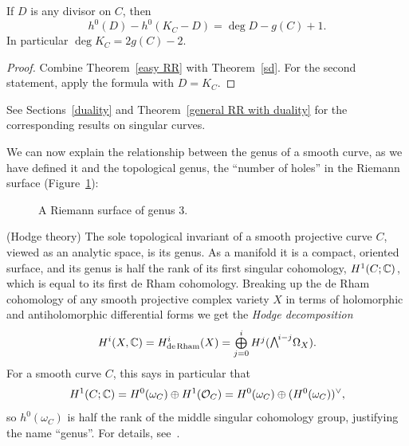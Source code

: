 \begin{theorem}\label{RR theorem}
If $D$ is any divisor on $C$, then 
$$
h^0(D) - h^0(K_C -D) = \deg D - g(C) +1.
$$
In particular $\deg K_C = 2g(C) -2$.
\end{theorem}

\begin{proof}
Combine Theorem~\ref{easy RR} with Theorem~\ref{sd}. For the second statement,
apply the formula with $D = K_C$.
\end{proof}

See Sections~\ref{duality} and Theorem~\ref{general RR with duality} for the corresponding results on singular curves.

We can now explain the relationship between the genus of a smooth curve, as we have defined it and the 
topological genus, the ``number of holes'' in the Riemann surface (Figure~\ref{RiemannSurface}):


\begin{figure}   %
\vskip-20pt
\vskip-15pt
\caption{A Riemann surface of genus 3.
}
\label{RiemannSurface}
\end{figure}


\begin{fact} (Hodge theory)
The sole topological invariant of a smooth projective curve $C$,
viewed as an analytic space, is its genus. As a manifold it is a
compact, oriented surface, and its genus is half the rank of its first
singular cohomology, $H^{1}(C; {\mathbb C})$, which is equal to its first 
de Rham 
cohomology.
Breaking up the de Rham cohomology of any smooth projective complex variety $X$ in terms of holomorphic and antiholomorphic differential
forms we get the \emph{Hodge decomposition}
$$
H^i(X,\CC) = H^i_{\mathrm{de\,Rham}}(X) = 
\tsty\bigoplus\limits_{j=0}^i H^j(\mwedge^{i-j} \Omega_X).
$$
For a smooth curve $C$, this says in  particular that
$$
H^1(C; {\mathbb C}) = H^0(\omega_C)\oplus H^1({\mathcal O}_C) = H^0(\omega_C)\oplus (H^0(\omega_C))^\vee, 
$$
so $ h^0(\omega_C)$ is half the rank of the middle singular cohomology
group, justifying the name ``genus''. For details, 
see~\cite[p.\,116]{Griffiths-Harris1978}.
\end{fact}

